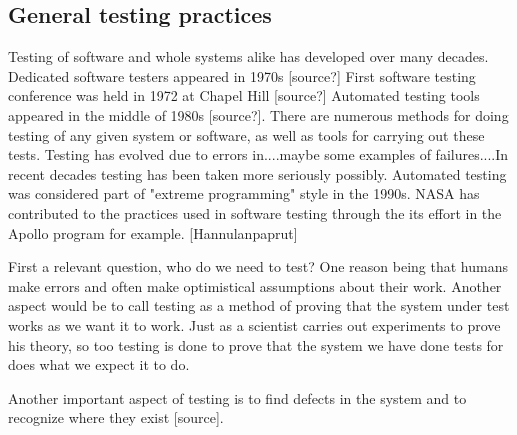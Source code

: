 \documentclass[english,12pt,a4paper,pdftex,elec,utf8]{aaltothesis}
\begin{document}
\subsection{General testing practices}
Testing of software and whole systems alike has developed over many decades. Dedicated software testers appeared in 1970s [source?] First software testing conference was held in 1972 at Chapel Hill [source?] Automated testing tools appeared in the middle of 1980s [source?]. There are numerous methods for doing testing of any given system or software, as well as tools for carrying out these tests. Testing has evolved due to errors in....maybe some examples of failures....In recent decades testing has been taken more seriously possibly. Automated testing was considered part of "extreme programming" style in the 1990s.
NASA has contributed to the practices used in software testing through the its effort in the Apollo program for example. [Hannulanpaprut]\par
First a relevant question, who do we need to test? One reason being that humans make errors and often make optimistical assumptions about their work. Another aspect would be to call testing as a method of proving that the system under test works as we want it to work. Just as  a scientist carries out experiments to prove his theory, so too testing is done to prove that the system we have done tests for does what we expect it to do. \cite{testingcomplex}\par
Another important aspect of testing is to find defects in the system and to recognize where they exist [source].
\end{document}
